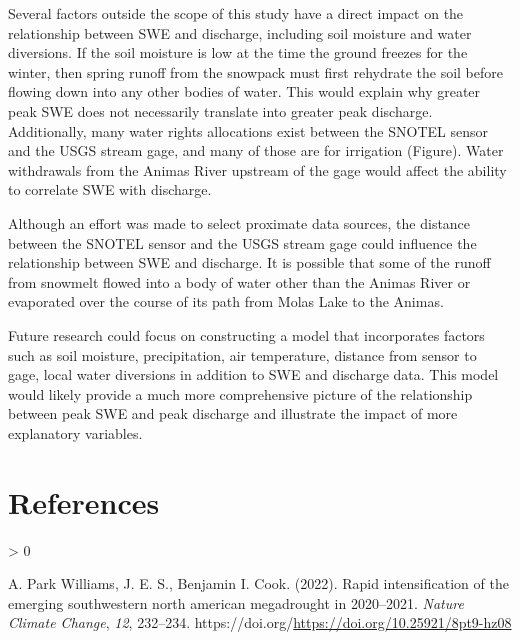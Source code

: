 \documentclass[
  12pt,
]{article}
\newlength{\cslhangindent}
\newenvironment{CSLReferences}[2] %
 {%
  \setlength{\parindent}{0pt}
  \ifodd #1 \everypar{\setlength{\hangindent}{\cslhangindent}}\ignorespaces\fi
  \ifnum #2 > 0
  \setlength{\parskip}{#2\baselineskip}
  \fi
 }%
 {}
\begin{document}
Several factors outside the scope of this study have a direct impact on
the relationship between SWE and discharge, including soil moisture and
water diversions. If the soil moisture is low at the time the ground
freezes for the winter, then spring runoff from the snowpack must first
rehydrate the soil before flowing down into any other bodies of water.
This would explain why greater peak SWE does not necessarily translate
into greater peak discharge. Additionally, many water rights allocations
exist between the SNOTEL sensor and the USGS stream gage, and many of
those are for irrigation (Figure). Water withdrawals from the Animas
River upstream of the gage would affect the ability to correlate SWE
with discharge.

Although an effort was made to select proximate data sources, the
distance between the SNOTEL sensor and the USGS stream gage could
influence the relationship between SWE and discharge. It is possible
that some of the runoff from snowmelt flowed into a body of water other
than the Animas River or evaporated over the course of its path from
Molas Lake to the Animas.

Future research could focus on constructing a model that incorporates
factors such as soil moisture, precipitation, air temperature, distance
from sensor to gage, local water diversions in addition to SWE and
discharge data. This model would likely provide a much more
comprehensive picture of the relationship between peak SWE and peak
discharge and illustrate the impact of more explanatory variables.

\newpage

\hypertarget{references}{%
\section*{References}\label{references}}

\hypertarget{refs}{}
\begin{CSLReferences}{1}{0}
\leavevmode\hypertarget{ref-WILLIAMS2022232}{}%
A. Park Williams, J. E. S., Benjamin I. Cook. (2022). Rapid
intensification of the emerging southwestern north american megadrought
in 2020--2021. \emph{Nature Climate Change}, \emph{12}, 232--234.
https://doi.org/\url{https://doi.org/10.25921/8pt9-hz08}

\end{CSLReferences}
\end{document}
